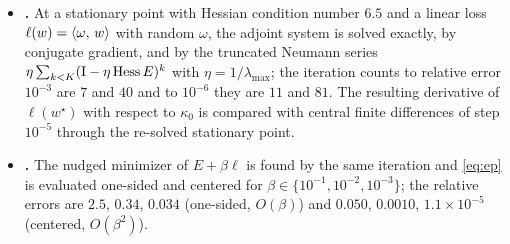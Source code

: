 \begin{itemize}
  \item \textbf{.} At a stationary point with Hessian condition number $6.5$ and a
  linear loss $\ell(w)=\langle \omega,\, w\rangle$ with random $\omega$, the adjoint system is solved exactly, by
  conjugate gradient, and by the truncated Neumann series $\eta\sum_{k<K}(\mathrm{I}-\eta\operatorname{Hess}E)^k$
  with $\eta=1/\lambda_{\max}$; the iteration counts to relative error $10^{-3}$ are $7$ and $40$ and
  to $10^{-6}$ they are $11$ and $81$. The resulting derivative of $\ell(w^\star)$ with respect to
  $\kappa_0$ is compared with central finite differences of step $10^{-5}$ through the re-solved
  stationary point.
  \item \textbf{.} The nudged minimizer of $E+\beta\ell$ is found by the same iteration
  and \eqref{eq:ep} is evaluated one-sided and centered for $\beta\in\{10^{-1},10^{-2},10^{-3}\}$;
  the relative errors are $2.5$, $0.34$, $0.034$ (one-sided, $O(\beta)$) and $0.050$, $0.0010$,
  $1.1\times10^{-5}$ (centered, $O(\beta^2)$).
\end{itemize}

